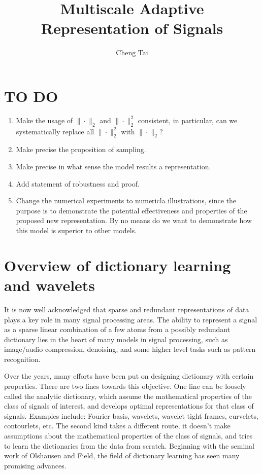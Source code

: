 \documentclass[a4paper]{article}
\begin{document}
\newtheorem{lem}{Lemma}
\newtheorem{prop}{Proposition}
\newtheorem{rem}{Remark}
\renewcommand{\a}{\mathbf{a}}
\renewcommand{\v}{\mathbf{v}}
\title{Multiscale Adaptive Representation of Signals}
\author{Cheng Tai}
\date{}
\maketitle
{}
\tableofcontents
\newpage
{\color{red}
\section*{TO DO}
\begin{enumerate}
\item Make the usage of $\|\cdot \|_2$ and $\| \cdot \|_2^2$ consistent, in particular, can we systematically replace all $\| \cdot \|_2^2$ with $\|\cdot\|_2$?
\item Make precise the proposition of sampling.
\item Make precise in what sense the model results a representation.
\item Add statement of robustness and proof.
\item Change the numerical experiments to numericla illustrations, since the purpose is to demonstrate the potential effectiveness and properties of the proposed new representation. By no means do we want to demonstrate how this model is superior to other models. 
\end{enumerate}
}
\section{Overview of dictionary learning and wavelets}
It is now well acknowledged that sparse and redundant representations of data plays a key role in many signal processing areas. The ability to represent a signal as a sparse linear combination of a few atoms from a possibly redundant dictionary lies in the heart of many models in signal processing, such as image/audio compression, denoising, and some higher level tasks such as pattern recognition.

Over the years, many efforts have been put on designing dictionary with certain properties. There are two lines towards this objective.  One line can be loosely called the analytic dictionary, which assume the mathematical properties of the class of signals of interest, and develops optimal representations for that class of signals. Examples include: Fourier basis, wavelets, wavelet tight frames, curvelets, contourlets, etc. The second kind takes a different route, it doesn't make assumptions about the mathematical properties of the class of signals, and tries to learn the dictionaries from the data from scratch. Beginning with the seminal work of Olshausen and Field, the field of dictionary learning has seen many promising advances. 
\end{document}
